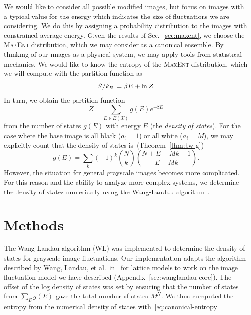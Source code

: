 \documentclass[aps,reprint]{revtex4-2}
\renewcommand\mathrm\textnormal%
\theoremstyle{plain}
\theoremstyle{definition}
\renewcommand\ln{\operatorname{\mathrm{ln}}}
\begin{document}
We would like to consider all possible modified images, but focus on images with
a typical value for the energy which indicates the size of fluctuations we are
considering. We do this by assigning a probability distribution to the images
with constrained average energy. Given the results of Sec.~\ref{sec:maxent}, we
choose the \textsc{MaxEnt} distribution, which we may consider as a canonical
ensemble. By thinking of our images as a physical system, we may apply tools
from statistical mechanics. We would like to know the entropy of the
\textsc{MaxEnt} distribution, which we will compute with the partition function as
\begin{equation}
  \flatfrac{S}{k_B}
  = \beta E + \ln Z.
  \label{eq:canonical-entropy}
\end{equation}
In turn, we obtain the partition function
\begin{equation}
  Z
  = \sum_{E \in E(\mathcal{X})} g(E) e^{-\beta E}
  \label{eq:partition-function}
\end{equation}
from the number of states $g(E)$ with energy $E$ (the \emph{density of states}).
For the case where the base image is all black ($a_i = 1$) or all white ($a_i =
M$), we may explicitly count that the density of states
is~(Theorem~\ref{thm:bw-g})
\begin{equation}
  g(E)
  = \sum_k {(-1)}^k \binom{N}{k} \binom{N + E - Mk - 1}{E - Mk}.
  \label{eq:bw-g}
\end{equation}
However, the situation for general grayscale images becomes more complicated.
For this reason and the ability to analyze more complex systems, we determine
the density of states numerically using the Wang-Landau
algorithm~\cite{wanglandau}.

\section{Methods}

The Wang-Landau algorithm (WL) was implemented to determine the density of
states for grayscale image fluctuations. Our implementation adapts the algorithm
described by Wang, Landau, et al.\ in~\cite{wanglandau,wanglandau-ajp} for
lattice models to work on the image fluctuation model we have described
(Appendix~\ref{sec:wanglandau-core}). The offset of the log density of states
was set by ensuring that the number of states from $\sum_E g(E)$ gave the total
number of states $M^N$. We then computed the entropy from the numerical density
of states with~\eqref{eq:canonical-entropy}.
\end{document}
